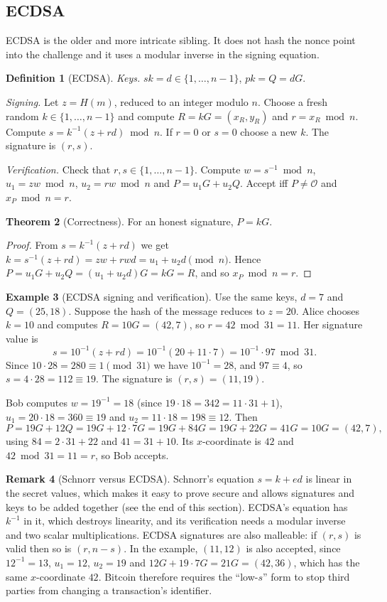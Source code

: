 \documentclass[11pt,a4paper]{article}
\theoremstyle{definition}
\newtheorem{definition}{Definition}[section]
\newtheorem{theorem}[definition]{Theorem}
\newtheorem{example}[definition]{Example}
\newtheorem{remark}[definition]{Remark}
\newcommand{\sk}{\mathit{sk}}
\newcommand{\pk}{\mathit{pk}}
\newcommand{\Hash}{H}
\begin{document}
\subsection{ECDSA}

ECDSA is the older and more intricate sibling. It does not hash the nonce point into the challenge and it uses a modular inverse in the signing equation.

\begin{definition}[ECDSA]
\emph{Keys.} $\sk=d\in\{1,\dots,n-1\}$, $\pk=Q=dG$.

\emph{Signing.} Let $z=\Hash(m)$, reduced to an integer modulo $n$. Choose a fresh random $k\in\{1,\dots,n-1\}$ and compute $R=kG=(x_R,y_R)$ and $r=x_R \bmod n$. Compute $s=k^{-1}(z+rd) \bmod n$. If $r=0$ or $s=0$ choose a new $k$. The signature is $(r,s)$.

\emph{Verification.} Check that $r,s\in\{1,\dots,n-1\}$. Compute $w=s^{-1} \bmod n$, $u_1=zw \bmod n$, $u_2=rw \bmod n$ and $P=u_1G+u_2Q$. Accept iff $P\ne\mathcal{O}$ and $x_P \bmod n=r$.
\end{definition}

\begin{theorem}[Correctness]
For an honest signature, $P=kG$.
\end{theorem}
\begin{proof}
From $s=k^{-1}(z+rd)$ we get $k=s^{-1}(z+rd)=zw+rwd=u_1+u_2d \pmod n$. Hence $P=u_1G+u_2Q=(u_1+u_2d)G=kG=R$, and so $x_P \bmod n=r$.
\end{proof}

\begin{example}[ECDSA signing and verification]\label{ex:ecdsa}
Use the same keys, $d=7$ and $Q=(25,18)$. Suppose the hash of the message reduces to $z=20$. Alice chooses $k=10$ and computes $R=10G=(42,7)$, so $r=42 \bmod 31=11$. Her signature value is
\[
s = 10^{-1}(z+rd) = 10^{-1}(20+11\cdot 7) = 10^{-1}\cdot 97 \bmod 31.
\]
Since $10\cdot 28=280\equiv 1 \pmod{31}$ we have $10^{-1}=28$, and $97\equiv 4$, so $s=4\cdot 28=112\equiv 19$. The signature is $(r,s)=(11,19)$.

Bob computes $w=19^{-1}=18$ (since $19\cdot 18=342=11\cdot 31+1$), $u_1=20\cdot 18=360\equiv 19$ and $u_2=11\cdot 18=198\equiv 12$. Then
\[
P=19G+12Q=19G+12\cdot 7G=19G+84G=19G+22G=41G=10G=(42,7),
\]
using $84=2\cdot 31+22$ and $41=31+10$. Its $x$-coordinate is $42$ and $42 \bmod 31=11=r$, so Bob accepts.
\end{example}

\begin{remark}[Schnorr versus ECDSA]
Schnorr's equation $s=k+ed$ is linear in the secret values, which makes it easy to prove secure and allows signatures and keys to be added together (see the end of this section). ECDSA's equation has $k^{-1}$ in it, which destroys linearity, and its verification needs a modular inverse and two scalar multiplications. ECDSA signatures are also malleable: if $(r,s)$ is valid then so is $(r,n-s)$. In the example, $(11,12)$ is also accepted, since $12^{-1}=13$, $u_1=12$, $u_2=19$ and $12G+19\cdot 7G=21G=(42,36)$, which has the same $x$-coordinate $42$. Bitcoin therefore requires the ``low-$s$'' form to stop third parties from changing a transaction's identifier.
\end{remark}
\end{document}
